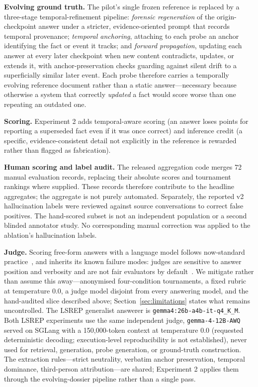 \documentclass[twoside,11pt]{article}
\begin{document}
\textbf{Evolving ground truth.} The pilot's single frozen reference is replaced by a three-stage temporal-refinement pipeline: \emph{forensic regeneration} of the origin-checkpoint answer under a stricter, evidence-oriented prompt that records temporal provenance; \emph{temporal anchoring}, attaching to each probe an anchor identifying the fact or event it tracks; and \emph{forward propagation}, updating each answer at every later checkpoint when new content contradicts, updates, or extends it, with anchor-preservation checks guarding against silent drift to a superficially similar later event. Each probe therefore carries a temporally evolving reference document rather than a static answer---necessary because otherwise a system that correctly \emph{updated} a fact would score worse than one repeating an outdated one.

\textbf{Scoring.} Experiment 2 adds temporal-aware scoring (an answer loses points for reporting a superseded fact even if it was once correct) and inference credit (a specific, evidence-consistent detail not explicitly in the reference is rewarded rather than flagged as fabrication).

\textbf{Human scoring and label audit.} The released aggregation code merges 72 manual evaluation records, replacing their absolute scores and tournament rankings where supplied. These records therefore contribute to the headline aggregates; the aggregate is not purely automated. Separately, the reported v2 hallucination labels were reviewed against source conversations to correct false positives. The hand-scored subset is not an independent population or a second blinded annotator study. No corresponding manual correction was applied to the ablation's hallucination labels.

\textbf{Judge.} Scoring free-form answers with a language model follows now-standard practice~\citep{zheng2023judging,liu2023geval}, and inherits its known failure modes: judges are sensitive to answer position and verbosity and are not fair evaluators by default~\citep{wang2024unfair}. We mitigate rather than assume this away---anonymised four-condition tournaments, a fixed rubric at temperature 0.0, a judge model disjoint from every answering model, and the hand-audited slice described above; Section~\ref{sec:limitations} states what remains uncontrolled. The LSREP generalist answerer is \texttt{gemma4:26b-a4b-it-q4\_K\_M}. Both LSREP experiments use the same independent judge, \texttt{gemma-4-12B-AWQ} served on SGLang with a 150{,}000-token context at temperature 0.0 (requested deterministic decoding; execution-level reproducibility is not established), never used for retrieval, generation, probe generation, or ground-truth construction. The extraction rules---strict neutrality, verbatim anchor preservation, temporal dominance, third-person attribution---are shared; Experiment 2 applies them through the evolving-dossier pipeline rather than a single pass.
\end{document}
